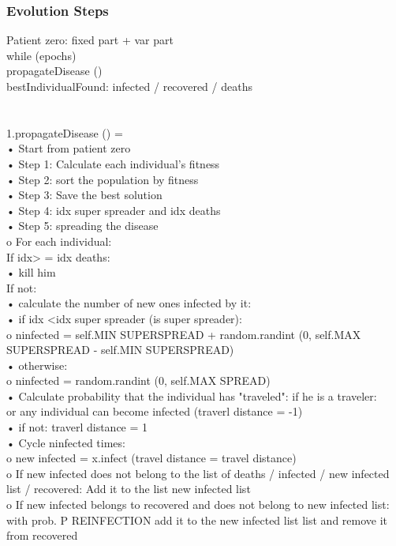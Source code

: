 \documentclass[letterpaper]{article}%
\begin{document}
\subsubsection{Evolution Steps}
Patient zero: fixed part + var part\\
while (epochs) {\\
propagateDisease ()\\
bestIndividualFound: infected / recovered / deaths\\
}\\
\\
1.propagateDisease () =\\
• Start from patient zero\\
• Step 1: Calculate each individual's fitness\\
• Step 2: sort the population by fitness\\
• Step 3: Save the best solution\\
• Step 4: idx super spreader and idx deaths\\
• Step 5: spreading the disease\\
o For each individual:\\
If idx> = idx deaths:\\
• kill him\\
If not:\\
• calculate the number of new ones infected by it:\\
• if idx <idx super spreader (is super spreader):\\
o ninfected = self.MIN SUPERSPREAD + random.randint (0, self.MAX SUPERSPREAD - self.MIN SUPERSPREAD)\\
• otherwise:\\
o ninfected = random.randint (0, self.MAX SPREAD)\\
• Calculate probability that the individual has "traveled": if he is a traveler:\\
or any individual can become infected (traverl distance = -1)\\
• if not: traverl distance = 1\\
• Cycle ninfected times:\\
o new infected = x.infect (travel distance = travel distance)\\
o If new infected does not belong to the list of deaths / infected / new infected list / recovered: Add it to the list new infected list\\
o If new infected belongs to recovered and does not belong to new infected list:\\
with prob. P REINFECTION add it to the new infected list list and remove it from recovered\\
\end{document}

